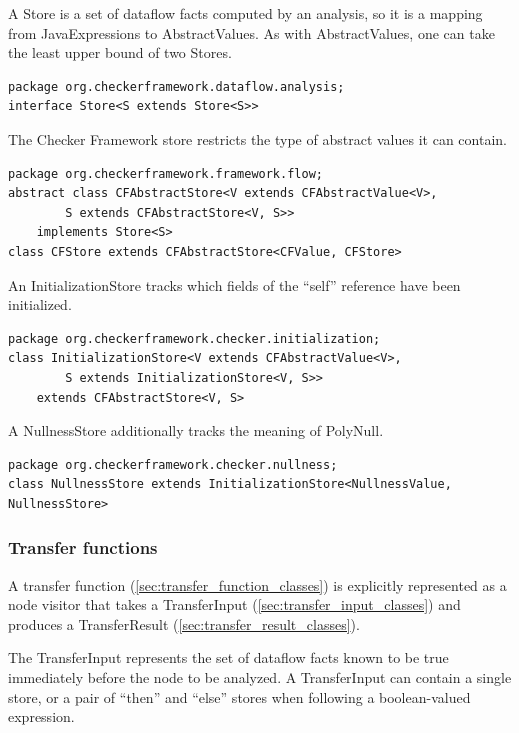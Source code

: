 A Store is a set of dataflow facts computed by an analysis, so it is a
mapping from JavaExpressions to AbstractValues.  As with
AbstractValues, one can take the least upper bound of two Stores.

\begin{verbatim}
package org.checkerframework.dataflow.analysis;
interface Store<S extends Store<S>>
\end{verbatim}

The Checker Framework store restricts the type of abstract values it
can contain.

\begin{verbatim}
package org.checkerframework.framework.flow;
abstract class CFAbstractStore<V extends CFAbstractValue<V>,
        S extends CFAbstractStore<V, S>>
    implements Store<S>
class CFStore extends CFAbstractStore<CFValue, CFStore>
\end{verbatim}

An InitializationStore tracks which fields of the ``self'' reference
have been initialized.

\begin{verbatim}
package org.checkerframework.checker.initialization;
class InitializationStore<V extends CFAbstractValue<V>,
        S extends InitializationStore<V, S>>
    extends CFAbstractStore<V, S>
\end{verbatim}

A NullnessStore additionally tracks the meaning of PolyNull.

\begin{verbatim}
package org.checkerframework.checker.nullness;
class NullnessStore extends InitializationStore<NullnessValue, NullnessStore>
\end{verbatim}


\subsubsection{Transfer functions}
\label{sec:transfer_functions}

A transfer function (\autoref{sec:transfer_function_classes}) is
explicitly represented as a node visitor that takes a TransferInput
(\autoref{sec:transfer_input_classes}) and produces a TransferResult
(\autoref{sec:transfer_result_classes}).

\label{sec:transfer_input_classes}

The TransferInput represents the set of dataflow facts known to be
true immediately before the node to be analyzed.  A TransferInput can
contain a single store, or a pair of ``then'' and ``else'' stores when
following a boolean-valued expression.

